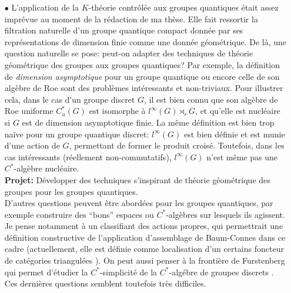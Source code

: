 \documentclass[a4paper,11pt]{article}
\begin{document}
\begin{itemize}
Dans ce cas, nous pouvons montrer l'existence d'un projecteur de Kazdhan, aux propri\'et\'e si exotiques que, moyennant des renforcements \`a la propr\'et\'e T, ne peut pas se trouver dans l'image de l'application d'assemblage de Baum-Connes.\\

\textbf{Projet:} D\'ecrire avec plus de pr\'ecision les liens entre la propri\'et\'e T dynamique et l'obstruction \`a la conjecture de Baum-Connes.\\

Il semble probable de pouvoir prouver que la propri\'et\'e T dynamique constitue, moyennant des conditions suppl\'ementaires, une obstruction \`a l'exactitude en $K$-th\'eorie de certaines $C^*$-alg\`ebres, comme dans les exemples de Skandalis \cite{skandalis1988notion}. Des calculs d\'ej\`a effectu\'es sur des classes d'exemples confirment cette affirmation.\\

\item[$\bullet$] L'application de la $K$-th\'eorie contr\^ol\'ee aux groupes quantiques \'etait assez impr\'evue au moment de la r\'edaction de ma th\`ese. Elle fait ressortir la filtration naturelle d'un groupe quantique compact donn\'ee par ses repr\'esentations de dimension finie comme une donn\'ee g\'eom\'etrique. De l\`a, une question naturelle se pose: peut-on adapter des techniques de th\'eorie g\'eom\'etrique des groupes aux groupes quantiques? Par exemple, la d\'efinition de \textit{dimension asymptotique} pour un groupe quantique ou encore celle de son alg\`ebre de Roe sont des probl\`emes int\'eressants et non-triviaux. Pour illustrer cela, dans le cas d'un groupe discret $G$, il est bien connu que son alg\`ebre de Roe uniforme $C^*_u(G)$ est isomorphe \`a $l^\infty(G)\rtimes_r G$, et qu'elle est nucl\'eaire si $G$ est de dimension asymptotique finie. La m\^eme d\'efinition est bien trop na\"ive pour un groupe quantique discret: $l^\infty(G)$ est bien d\'efinie et est munie d'une action de $G$, permettant de former le produit crois\'e. Toutefois, dans les cas int\'eressants (r\'eellement non-commutatifs), $l^\infty(G)$ n'est m\^eme pas une $C^*$-alg\`ebre nucl\'eaire.  \\

\textbf{Projet:} D\'evelopper des techniques s'inspirant de th\'eorie g\'eom\'etrique des groupes pour les groupes quantiques.\\

D'autres questions peuvent \^etre abord\'ees pour les groupes quantiques, par exemple construire des ``bons'' espaces ou $C^*$-alg\`ebres sur lesquels ils agissent. Je pense notamment \`a un classifiant des actions propres, qui permettrait une d\'efinition constructive de l'application d'assemblage de Baum-Connes dans ce cadre (actuellement, elle est d\'efinie comme localisation d'un certains foncteur de cat\'egories triangul\'ees \cite{MeyerNest}). On peut aussi penser \`a la fronti\`ere de Furstenberg qui permet d'\'etudier la $C^*$-simplicit\'e de la $C^*$-alg\'ebre de groupes discrets \cite{kalantar2014boundaries}. Ces derni\`eres questions semblent toutefois tr\`es difficiles.\\ 


\end{itemize}
\end{document}

